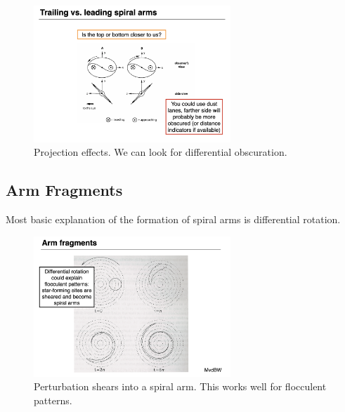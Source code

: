 \documentclass{article}
\begin{document}
\begin{figure}
    \centering
    \includegraphics[width=0.66\textwidth]{figs/Screen Shot 2021-10-27 at 10.12.41 AM.png}
    \caption{Projection effects. We can look for differential obscuration.  }
    \label{fig:proj_eff}
\end{figure}

\subsection{Arm Fragments}

Most basic explanation of the formation of spiral arms is differential rotation.

\begin{figure}
    \centering
    \includegraphics[width=0.66\textwidth]{figs/Screen Shot 2021-10-27 at 10.16.44 AM.png}
    \caption{Perturbation shears into a spiral arm. This works well for flocculent patterns.}
    \label{fig:arm_fragment_theory}
\end{figure}
\end{document}
